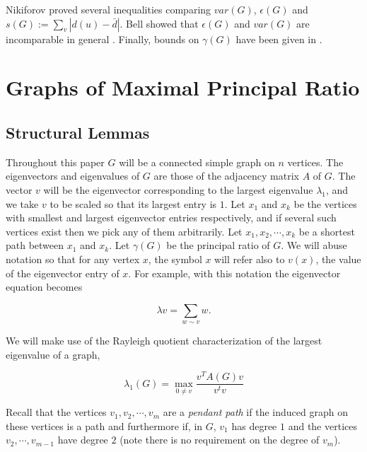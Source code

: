 Nikiforov \cite{Nikiforov2006} proved several inequalities comparing
$var(G)$, $\epsilon(G)$ and $s(G) := \sum_v |d(u) - \bar{d}|$.  
Bell showed that $\epsilon(G)$ and $var(G)$ are incomparable in general
\cite{Bell1992}.  Finally, bounds on $\gamma(G)$ have been given in
\cite{CioabaGregory2007, PapendieckRecht2000, Minc1970, Latham1995, Zhang2005}.


\section{Graphs of Maximal Principal Ratio}

\subsection{Structural Lemmas}

Throughout this paper $G$ will be a connected simple graph on $n$ vertices.
The eigenvectors and eigenvalues of $G$ are those of the adjacency
matrix $A$ of $G$.  The vector $v$ will be the eigenvector corresponding
to the largest eigenvalue $\lambda_1$,  and we take $v$ to be scaled
so that its largest entry is $1$.  Let $x_1$ and $x_k$
be the vertices with smallest and largest eigenvector entries respectively, and
if several such vertices exist then we pick any of them arbitrarily.
Let $x_1, x_2, \cdots, x_k$ be a shortest path between $x_1$ and
$x_k$.  Let $\gamma(G)$ be the principal ratio of $G$.  We will abuse
notation so that for any vertex $x$, the symbol $x$ will refer also to $v(x)$,
the value of the eigenvector entry of $x$.  For example, with this notation
the eigenvector equation becomes

 \[ \lambda v = \sum_{w \sim v} w. \]

\noindent We will make use of the Rayleigh quotient characterization of the
largest eigenvalue of a graph,

\begin{equation}\label{rayleigh}
  \lambda_1(G) = \max_{0 \neq v} \frac{v^T A(G) v}{v^t v} 
\end{equation}


Recall that the vertices $v_1, v_2, \cdots, v_m$ are a 
\textit{pendant path} if the induced graph on these vertices
is a path and furthermore if, in $G$, $v_1$ has degree $1$ and
the vertices $v_2, \cdots, v_{m-1}$ have degree $2$
(note there is no requirement on the degree of $v_m$).

